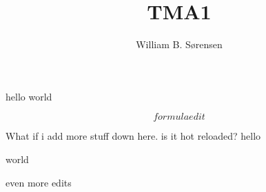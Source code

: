 \documentclass{article}
\author{William B. Sørensen}
\title{TMA1}
\begin{document}
\maketitle

hello world

$$formula edit$$

What if i add more stuff down here. is it hot reloaded?
hello

world

even more edits
\end{document}
